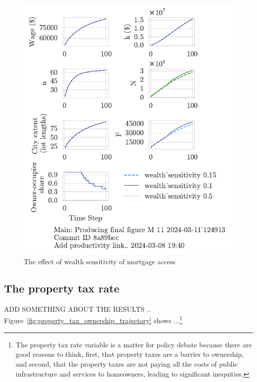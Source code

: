 \begin{figure}[h!bt]
    \centering
    \includegraphics[scale=1, trim={0 1.4cm 0 0},clip]{fig/wealth_sensitivity-124913.pdf}
    \caption{The effect of wealth sensitivity of mortgage access}
    \label{fig:wealth_sensitivity_ownership_trajectory}
\end{figure}

\newpage
\subsection{The property tax rate}
{\color{red} ADD SOMETHING ABOUT THE RESULTS .. Figure~\ref{fig:property_tax_ownership_trajectory} shows ...}\footnote{The property tax rate variable is a matter for policy debate because there are good reasons to think, first, that property taxes are a barrier to ownership, and second, that the property taxes are not paying all the costs of public infrastructure and services to homeowners, leading to significant inequities.}

